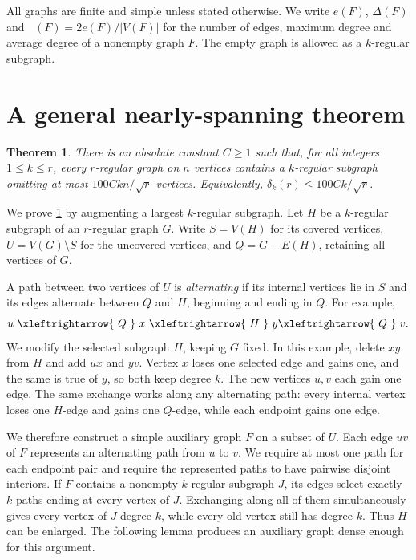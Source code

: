 \documentclass[11pt]{amsart}
\newtheorem{theorem}{Theorem}[section]
\theoremstyle{remark}
\DeclareMathOperator{\avdeg}{\overline d}
\begin{document}
All graphs are finite and simple unless stated otherwise. We write $e(F)$, $\Delta(F)$ and $\avdeg(F)=2e(F)/|V(F)|$ for the number of edges, maximum degree and average degree of a nonempty graph $F$. The empty graph is allowed as a $k$-regular subgraph.
\section{A general nearly-spanning theorem}\label{sec:augmentation}

\begin{theorem}\label{thm:main}
There is an absolute constant $C\ge1$ such that, for all integers $1\le k\le r$, every $r$-regular graph on $n$ vertices contains a $k$-regular subgraph omitting at most $100Ckn/\sqrt r$ vertices. Equivalently, $\delta_k(r)\le100Ck/\sqrt r$.
\end{theorem}

We prove \cref{thm:main} by augmenting a largest $k$-regular subgraph. Let $H$ be a $k$-regular subgraph of an $r$-regular graph $G$. Write $S=V(H)$ for its covered vertices, $U=V(G)\setminus S$ for the uncovered vertices, and $Q=G-E(H)$, retaining all vertices of $G$.

A path between two vertices of $U$ is \emph{alternating} if its internal vertices lie in $S$ and its edges alternate between $Q$ and $H$, beginning and ending in $Q$. For example,
\[
u\ \xleftrightarrow{\ Q\ }\ x\ \xleftrightarrow{\ H\ }\ y
\xleftrightarrow{\ Q\ }\ v.
\]
We modify the selected subgraph $H$, keeping $G$ fixed. In this example, delete $xy$ from $H$ and add $ux$ and $yv$. Vertex $x$ loses one selected edge and gains one, and the same is true of $y$, so both keep degree $k$. The new vertices $u,v$ each gain one edge. The same exchange works along any alternating path: every internal vertex loses one $H$-edge and gains one $Q$-edge, while each endpoint gains one edge.

We therefore construct a simple auxiliary graph $F$ on a subset of $U$. Each edge $uv$ of $F$ represents an alternating path from $u$ to $v$. We require at most one path for each endpoint pair and require the represented paths to have pairwise disjoint interiors. If $F$ contains a nonempty $k$-regular subgraph $J$, its edges select exactly $k$ paths ending at every vertex of $J$. Exchanging along all of them simultaneously gives every vertex of $J$ degree $k$, while every old vertex still has degree $k$. Thus $H$ can be enlarged. The following lemma produces an auxiliary graph dense enough for this argument.
\end{document}
